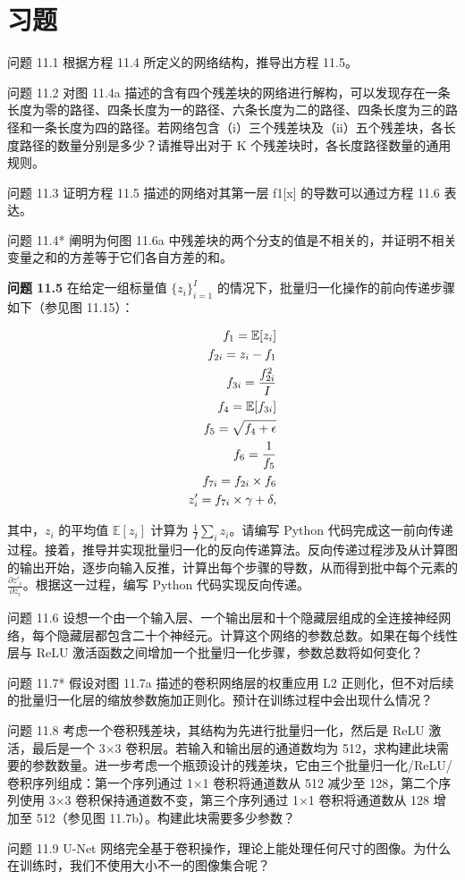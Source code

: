 \section{习题}  
问题 11.1 根据方程 11.4 所定义的网络结构，推导出方程 11.5。

问题 11.2 对图 11.4a 描述的含有四个残差块的网络进行解构，可以发现存在一条长度为零的路径、四条长度为一的路径、六条长度为二的路径、四条长度为三的路径和一条长度为四的路径。若网络包含（i）三个残差块及（ii）五个残差块，各长度路径的数量分别是多少？请推导出对于 K 个残差块时，各长度路径数量的通用规则。

问题 11.3 证明方程 11.5 描述的网络对其第一层 f1[x] 的导数可以通过方程 11.6 表达。

问题 11.4* 阐明为何图 11.6a 中残差块的两个分支的值是不相关的，并证明不相关变量之和的方差等于它们各自方差的和。

\textbf{问题 11.5} 在给定一组标量值 \(\{z_i\}_{i=1}^I\) 的情况下，批量归一化操作的前向传递步骤如下（参见图 11.15）：

\begin{align}
f_1 = \mathbb{E}[z_i] \notag \\
f_{2i} = z_i - f_1 \notag \\
f_{3i} = \frac{f_{2i}^2}{I} \notag \\
f_4 = \mathbb{E}[f_{3i}] \notag \\
f_5 = \sqrt{f_4 + \epsilon} \notag \\
f_6 = \frac{1}{f_5} \notag \\
f_{7i} = f_{2i} \times f_6 \notag \\
z'_i = f_{7i} \times \gamma + \delta, 
\end{align} 


其中，\(z_i\) 的平均值 \(\mathbb{E}[z_i]\) 计算为 \(\frac{1}{I} \sum_{i} z_i\)。请编写 Python 代码完成这一前向传递过程。接着，推导并实现批量归一化的反向传递算法。反向传递过程涉及从计算图的输出开始，逐步向输入反推，计算出每个步骤的导数，从而得到批中每个元素的 \(\frac{\partial z'_i}{\partial z_i}\)。根据这一过程，编写 Python 代码实现反向传递。

问题 11.6 设想一个由一个输入层、一个输出层和十个隐藏层组成的全连接神经网络，每个隐藏层都包含二十个神经元。计算这个网络的参数总数。如果在每个线性层与 ReLU 激活函数之间增加一个批量归一化步骤，参数总数将如何变化？

问题 11.7* 假设对图 11.7a 描述的卷积网络层的权重应用 L2 正则化，但不对后续的批量归一化层的缩放参数施加正则化。预计在训练过程中会出现什么情况？

问题 11.8 考虑一个卷积残差块，其结构为先进行批量归一化，然后是 ReLU 激活，最后是一个 3×3 卷积层。若输入和输出层的通道数均为 512，求构建此块需要的参数数量。进一步考虑一个瓶颈设计的残差块，它由三个批量归一化/ReLU/卷积序列组成：第一个序列通过 1×1 卷积将通道数从 512 减少至 128，第二个序列使用 3×3 卷积保持通道数不变，第三个序列通过 1×1 卷积将通道数从 128 增加至 512（参见图 11.7b）。构建此块需要多少参数？

问题 11.9 U-Net 网络完全基于卷积操作，理论上能处理任何尺寸的图像。为什么在训练时，我们不使用大小不一的图像集合呢？
